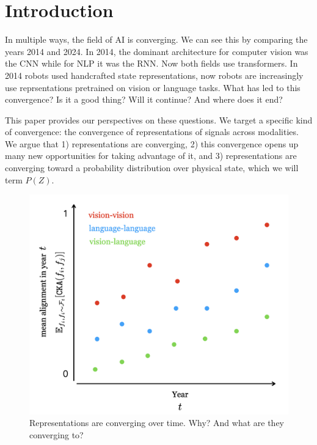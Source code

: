 \documentclass{article}
\theoremstyle{plain}
\theoremstyle{definition}
\theoremstyle{remark}
\begin{document}
\printAffiliationsAndNotice{\icmlEqualContribution} %


\section{Introduction}

In multiple ways, the field of AI is converging. We can see this by comparing the years 2014 and 2024. In 2014, the dominant architecture for computer vision was the CNN while for NLP it was the RNN. Now both fields use transformers. In 2014 robots used handcrafted state representations, now robots are increasingly use reprsentations pretrained on vision or language tasks. What has led to this convergence? Is it a good thing? Will it continue? And where does it end?

This paper provides our perspectives on these questions. We target a specific kind of convergence: the convergence of representations of signals across modalities. We argue that 1) representations are converging, 2) this convergence opens up many new opportunities for taking advantage of it, and 3) representations are converging toward a probability distribution over physical state, which we will term $P(Z)$.

\begin{figure}[t]
    \centering
    \includegraphics[width=1.0\linewidth]{figures/teaser.png}
    \caption{Representations are converging over time. Why? And what are they converging to?}
    \label{fig:convergence_over_time}
\end{figure}
\end{document}
